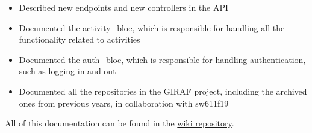 \begin{itemize}
    \item Described new endpoints and new controllers in the API
    \item Documented the activity\_bloc, which is responsible for handling all the functionality related to activities
    \item Documented the auth\_bloc, which is responsible for handling authentication, such as logging in and out
    \item Documented all the repositories in the GIRAF project, including the archived ones from previous years, in collaboration with sw611f19
\end{itemize}

All of this documentation can be found in the \href{https://github.com/aau-giraf/wiki}{wiki repository}.
